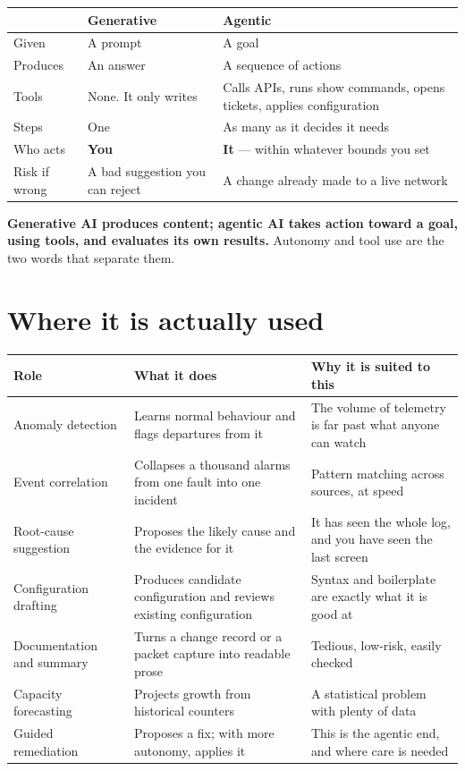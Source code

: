 \begin{longtable}{@{}L{3.1cm}L{5.7cm}L{6.1cm}@{}}
\toprule
{}
\textbf{} & \textbf{Generative} & \textbf{Agentic} \\
\midrule
\endhead
Given & A prompt & A goal \\
Produces & An answer & A sequence of actions \\
Tools & None. It only writes &
Calls APIs, runs show commands, opens tickets, applies configuration \\
Steps & One & As many as it decides it needs \\
Who acts & \textbf{You} & \textbf{It} --- within whatever bounds you set \\
Risk if wrong & A bad suggestion you can reject &
A change already made to a live network \\
\bottomrule
\end{longtable}

\begin{alertbox}
\textbf{Generative AI produces content; agentic AI takes action toward a goal,
using tools, and evaluates its own results.} Autonomy and tool use are the two
words that separate them.
\end{alertbox}

\section{Where it is actually used}

\begin{longtable}{@{}L{4.3cm}L{5.2cm}L{5.5cm}@{}}
\toprule
{}
\textbf{Role} & \textbf{What it does} & \textbf{Why it is suited to this} \\
\midrule
\endhead
Anomaly detection &
Learns normal behaviour and flags departures from it &
The volume of telemetry is far past what anyone can watch \\
Event correlation &
Collapses a thousand alarms from one fault into one incident &
Pattern matching across sources, at speed \\
Root-cause suggestion &
Proposes the likely cause and the evidence for it &
It has seen the whole log, and you have seen the last screen \\
Configuration drafting &
Produces candidate configuration and reviews existing configuration &
Syntax and boilerplate are exactly what it is good at \\
Documentation and summary &
Turns a change record or a packet capture into readable prose &
Tedious, low-risk, easily checked \\
Capacity forecasting &
Projects growth from historical counters &
A statistical problem with plenty of data \\
Guided remediation &
Proposes a fix; with more autonomy, applies it &
This is the agentic end, and where care is needed \\
\bottomrule
\end{longtable}

